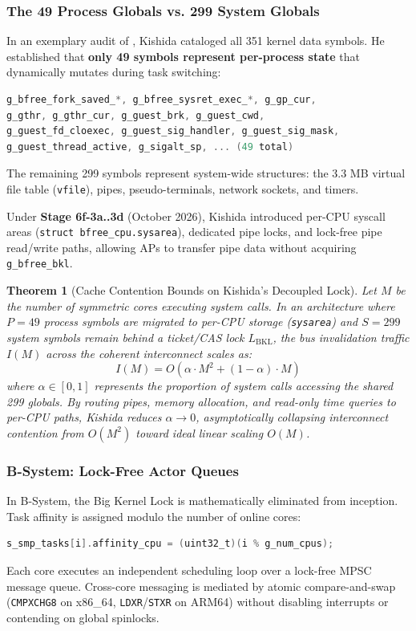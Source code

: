 \documentclass[10pt,journal,compsoc,twocolumn]{article}
\newtheorem{theorem}{Theorem}
\begin{document}
\subsubsection{The 49 Process Globals vs. 299 System Globals}
In an exemplary audit of , Kishida cataloged all 351 kernel data symbols. He established that \textbf{only 49 symbols represent per-process state} that dynamically mutates during task switching:
\begin{lstlisting}[language=C]
g_bfree_fork_saved_*, g_bfree_sysret_exec_*, g_gp_cur,
g_gthr, g_gthr_cur, g_guest_brk, g_guest_cwd,
g_guest_fd_cloexec, g_guest_sig_handler, g_guest_sig_mask,
g_guest_thread_active, g_sigalt_sp, ... (49 total)
\end{lstlisting}
The remaining 299 symbols represent system-wide structures: the 3.3 MB virtual file table (\texttt{vfile}), pipes, pseudo-terminals, network sockets, and timers.

Under \textbf{Stage 6f-3a..3d} (October 2026), Kishida introduced per-CPU syscall areas (\texttt{struct bfree\_cpu.sysarea}), dedicated pipe locks, and lock-free pipe read/write paths, allowing APs to transfer pipe data without acquiring \texttt{g\_bfree\_bkl}.

\begin{theorem}[Cache Contention Bounds on Kishida's Decoupled Lock]
Let $M$ be the number of symmetric cores executing system calls. In an architecture where $P = 49$ process symbols are migrated to per-CPU storage (\texttt{sysarea}) and $S = 299$ system symbols remain behind a ticket/CAS lock $L_{\text{BKL}}$, the bus invalidation traffic $I(M)$ across the coherent interconnect scales as:
\begin{equation}
I(M) = O\left( \alpha \cdot M^2 + (1 - \alpha) \cdot M \right)
\end{equation}
where $\alpha \in [0, 1]$ represents the proportion of system calls accessing the shared 299 globals. By routing pipes, memory allocation, and read-only time queries to per-CPU paths, Kishida reduces $\alpha \to 0$, asymptotically collapsing interconnect contention from $O(M^2)$ toward ideal linear scaling $O(M)$.
\end{theorem}

\subsubsection{B-System: Lock-Free Actor Queues}
In B-System, the Big Kernel Lock is mathematically eliminated from inception. Task affinity is assigned modulo the number of online cores:
\begin{lstlisting}[language=C]
s_smp_tasks[i].affinity_cpu = (uint32_t)(i % g_num_cpus);
\end{lstlisting}
Each core executes an independent scheduling loop over a lock-free MPSC message queue. Cross-core messaging is mediated by atomic compare-and-swap (\texttt{CMPXCHG8} on x86\_64, \texttt{LDXR}/\texttt{STXR} on ARM64) without disabling interrupts or contending on global spinlocks.
\end{document}
